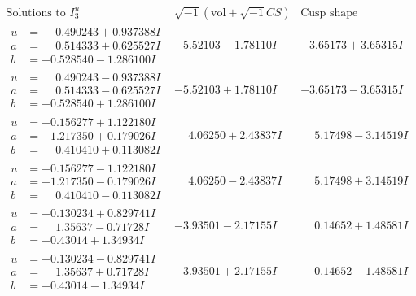 \documentclass[1p]{elsarticle_modified}
\theoremstyle{definition}
\newcommand{\I}{\sqrt{-1}}
\begin{document}
$$\begin{array}{c|c|c}  
\text{Solutions to }I^u_{3}& \I (\text{vol} + \sqrt{-1}CS) & \text{Cusp shape}\\
 \hline 
\begin{aligned}
u &= \phantom{-}0.490243 + 0.937388 I \\
a &= \phantom{-}0.514333 + 0.625527 I \\
b &= -0.528540 - 1.286100 I\end{aligned}
 & -5.52103 - 1.78110 I & -3.65173 + 3.65315 I \\ \hline\begin{aligned}
u &= \phantom{-}0.490243 - 0.937388 I \\
a &= \phantom{-}0.514333 - 0.625527 I \\
b &= -0.528540 + 1.286100 I\end{aligned}
 & -5.52103 + 1.78110 I & -3.65173 - 3.65315 I \\ \hline\begin{aligned}
u &= -0.156277 + 1.122180 I \\
a &= -1.217350 + 0.179026 I \\
b &= \phantom{-}0.410410 + 0.113082 I\end{aligned}
 & \phantom{-}4.06250 + 2.43837 I & \phantom{-}5.17498 - 3.14519 I \\ \hline\begin{aligned}
u &= -0.156277 - 1.122180 I \\
a &= -1.217350 - 0.179026 I \\
b &= \phantom{-}0.410410 - 0.113082 I\end{aligned}
 & \phantom{-}4.06250 - 2.43837 I & \phantom{-}5.17498 + 3.14519 I \\ \hline\begin{aligned}
u &= -0.130234 + 0.829741 I \\
a &= \phantom{-}1.35637 - 0.71728 I \\
b &= -0.43014 + 1.34934 I\end{aligned}
 & -3.93501 - 2.17155 I & \phantom{-}0.14652 + 1.48581 I \\ \hline\begin{aligned}
u &= -0.130234 - 0.829741 I \\
a &= \phantom{-}1.35637 + 0.71728 I \\
b &= -0.43014 - 1.34934 I\end{aligned}
 & -3.93501 + 2.17155 I & \phantom{-}0.14652 - 1.48581 I \\ \hline\begin{aligned}

\end{aligned}
\end{array}$$
\end{document}
